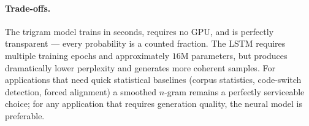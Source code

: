 \paragraph{Trade-offs.}
The trigram model trains in seconds, requires no GPU, and is perfectly
transparent --- every probability is a counted fraction. The LSTM
requires multiple training epochs and approximately $16$M parameters,
but produces dramatically lower perplexity and generates more coherent
samples. For applications that need quick statistical baselines (corpus
statistics, code-switch detection, forced alignment) a smoothed
$n$-gram remains a perfectly serviceable choice; for any application
that requires generation quality, the neural model is preferable.